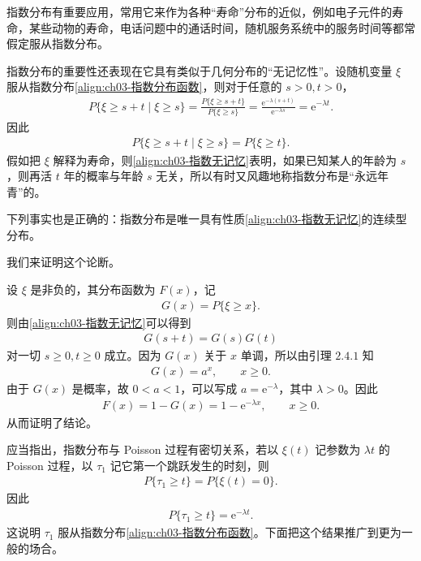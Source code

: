 \documentclass[../../main.tex]{subfiles}
\begin{document}
指数分布有重要应用，常用它来作为各种“寿命”分布的近似，例如电子元件的寿命，某些动物的寿命，电话问题中的通话时间，随机服务系统中的服务时间等都常假定服从指数分布。

指数分布的重要性还表现在它具有类似于几何分布的“无记忆性”。设随机变量 $\xi$ 服从指数分布\eqref{align:ch03-指数分布函数}，则对于任意的 $s>0,t>0$，
\begin{align*}P\{\xi\geqslant s+t\mid\xi\geqslant s\}=\frac{P\{\xi\geqslant s+t\}}{P\{\xi\geqslant s\}}=\frac{\mathrm{e}^{-\lambda(s+t)}}{\mathrm{e}^{-\lambda s}}=\mathrm{e}^{-\lambda t}.\end{align*}
因此
\begin{align}
P\{\xi\geqslant s+t\mid\xi\geqslant s\}=P\{\xi\geqslant t\}.\label{align:ch03-指数无记忆}
\end{align}
假如把 $\xi$ 解释为寿命，则\eqref{align:ch03-指数无记忆}表明，如果已知某人的年龄为 $s$，则再活 $t$ 年的概率与年龄 $s$ 无关，所以有时又风趣地称指数分布是“永远年青”的。

下列事实也是正确的：指数分布是唯一具有性质\eqref{align:ch03-指数无记忆}的连续型分布。

我们来证明这个论断。

设 $\xi$ 是非负的，其分布函数为 $F(x)$，记
\begin{align*}G(x)=P\{\xi\geqslant x\}.\end{align*}
则由\eqref{align:ch03-指数无记忆}可以得到
\begin{align*}G(s+t)=G(s)G(t)\end{align*}
对一切 $s\geqslant 0,t\geqslant 0$ 成立。因为 $G(x)$ 关于 $x$ 单调，所以由引理 $2.4.1$ 知
\begin{align*}G(x)=a^{x},\qquad x\geqslant 0.\end{align*}
由于 $G(x)$ 是概率，故 $0<a<1$，可以写成 $a=\mathrm{e}^{-\lambda}$，其中 $\lambda>0$。因此
\begin{align*}F(x)=1-G(x)=1-\mathrm{e}^{-\lambda x},\qquad x\geqslant 0.\end{align*}
从而证明了结论。

应当指出，指数分布与 Poisson 过程有密切关系，若以 $\xi(t)$ 记参数为 $\lambda t$ 的 Poisson 过程，以 $\tau_1$ 记它第一个跳跃发生的时刻，则
\begin{align*}P\{\tau_1\geqslant t\}=P\{\xi(t)=0\}.\end{align*}
因此
\begin{align*}P\{\tau_1\geqslant t\}=\mathrm{e}^{-\lambda t}.\end{align*}
这说明 $\tau_1$ 服从指数分布\eqref{align:ch03-指数分布函数}。下面把这个结果推广到更为一般的场合。
\end{document}
